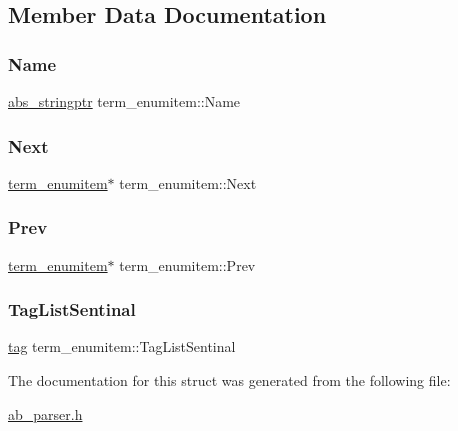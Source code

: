 \subsection{Member Data Documentation}
\mbox{\label{structterm__enumitem_a0e4d6c8b5e13dc1a983acfad9479248b}} 
\subsubsection{\texorpdfstring{Name}{Name}}
{\footnotesize\ttfamily \hyperlink{structabs__stringptr}{abs\+\_\+stringptr} term\+\_\+enumitem\+::\+Name}

\mbox{\label{structterm__enumitem_a76a5df14c05395f4737800d06c23611a}} 
\subsubsection{\texorpdfstring{Next}{Next}}
{\footnotesize\ttfamily \hyperlink{structterm__enumitem}{term\+\_\+enumitem}$\ast$ term\+\_\+enumitem\+::\+Next}

\mbox{\label{structterm__enumitem_a9841d521b128ff1d85936bdfded2e425}} 
\subsubsection{\texorpdfstring{Prev}{Prev}}
{\footnotesize\ttfamily \hyperlink{structterm__enumitem}{term\+\_\+enumitem}$\ast$ term\+\_\+enumitem\+::\+Prev}

\mbox{\label{structterm__enumitem_ace61cab8da4a090548e03c7a9970deb1}} 
\subsubsection{\texorpdfstring{Tag\+List\+Sentinal}{TagListSentinal}}
{\footnotesize\ttfamily \hyperlink{structtag}{tag} term\+\_\+enumitem\+::\+Tag\+List\+Sentinal}



The documentation for this struct was generated from the following file\+:\begin{DoxyCompactItemize}
\item 
\hyperlink{ab__parser_8h}{ab\+\_\+parser.\+h}\end{DoxyCompactItemize}
